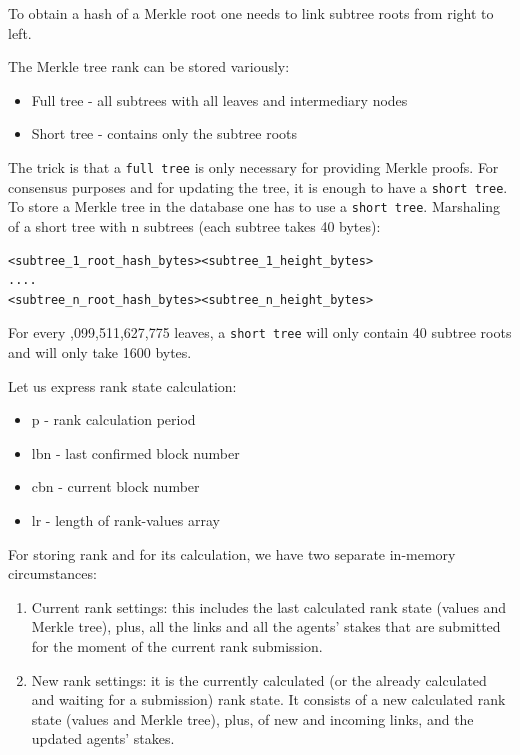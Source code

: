\documentclass[8pt,oneside]{amsart}
\newcommand{\code}[1]{{\PlayBold #1}}
\begin{document}
\begin{Abstract}
To obtain a hash of a Merkle root one needs to link subtree roots from right to left.

The Merkle tree rank can be stored variously:

\begin{itemize}
\item[] Full tree - all subtrees with all leaves and intermediary nodes
\item[] Short tree - contains only the subtree roots
\end{itemize}

The trick is that a \verb|full tree| is only necessary for providing Merkle proofs. For consensus purposes and for updating the tree, it is enough to have a \verb|short tree|. To store a Merkle tree in the database one has to use a \verb|short tree|. Marshaling of a short tree with \code{n} subtrees (each subtree takes 40 bytes):

\begin{lstlisting}
<subtree_1_root_hash_bytes><subtree_1_height_bytes>
....
<subtree_n_root_hash_bytes><subtree_n_height_bytes>
\end{lstlisting}

For every \code{1,099,511,627,775} leaves, a \verb|short tree| will only contain 40 subtree roots and will only take 1600 bytes.

Let us express rank state calculation:

\begin{itemize}
    \item[] \code{p} - rank calculation period
    \item[] \code{lbn} - last confirmed block number
    \item[] \code{cbn} - current block number
    \item[] \code{lr} -  length of rank-values array
\end{itemize}

For storing rank and for its calculation, we have two separate in-memory circumstances:

\begin{enumerate}
\item Current rank settings: this includes the last calculated rank state (values and Merkle tree), plus,
all the links and all the agents' stakes that are submitted for the moment of the current rank submission.
\item New rank settings: it is the currently calculated (or the already calculated and waiting for a submission) rank state. It consists of a new calculated rank state (values and Merkle tree), plus, of new and incoming links, and the updated agents' stakes.
\end{enumerate}


\end{Abstract}
\end{document}
